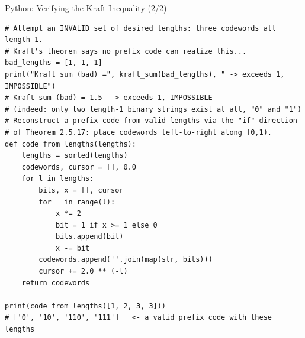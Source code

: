 \documentclass[aspectratio=169,10pt]{beamer}
\begin{document}
\begin{frame}[fragile]{Python: Verifying the Kraft Inequality (2/2)}
\begin{lstlisting}[style=python]
# Attempt an INVALID set of desired lengths: three codewords all length 1.
# Kraft's theorem says no prefix code can realize this...
bad_lengths = [1, 1, 1]
print("Kraft sum (bad) =", kraft_sum(bad_lengths), " -> exceeds 1, IMPOSSIBLE")
# Kraft sum (bad) = 1.5  -> exceeds 1, IMPOSSIBLE
# (indeed: only two length-1 binary strings exist at all, "0" and "1")
# Reconstruct a prefix code from valid lengths via the "if" direction
# of Theorem 2.5.17: place codewords left-to-right along [0,1).
def code_from_lengths(lengths):
    lengths = sorted(lengths)
    codewords, cursor = [], 0.0
    for l in lengths:
        bits, x = [], cursor
        for _ in range(l):
            x *= 2
            bit = 1 if x >= 1 else 0
            bits.append(bit)
            x -= bit
        codewords.append(''.join(map(str, bits)))
        cursor += 2.0 ** (-l)
    return codewords

print(code_from_lengths([1, 2, 3, 3]))
# ['0', '10', '110', '111']   <- a valid prefix code with these lengths
\end{lstlisting}
\end{frame}
\end{document}

